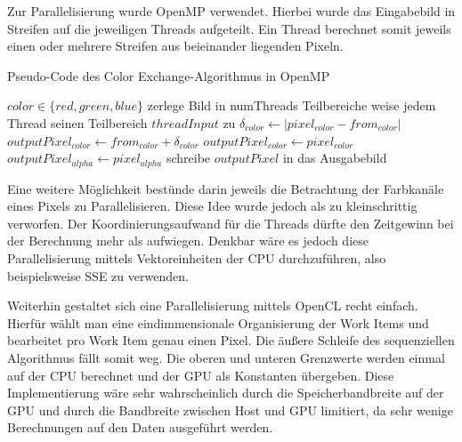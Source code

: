 \documentclass[10pt,a4paper]{article}
\providecommand{\abs}[1]{\lvert#1\rvert}
\begin{document}
Zur Parallelisierung wurde OpenMP verwendet. Hierbei wurde das Eingabebild in Streifen auf die jeweiligen Threads aufgeteilt. Ein Thread berechnet somit jeweils einen oder mehrere Streifen aus beieinander liegenden Pixeln.

\begin{algorithm}[H]
\caption{Pseudo-Code des \glqq Color Exchange\grqq-Algorithmus in OpenMP}
\label{algo:exchange_par}
\begin{algorithmic}[1]
\State $color \in \{red, green, blue\}$
\State zerlege Bild in numThreads Teilbereiche
\State weise jedem Thread seinen Teilbereich $threadInput$ zu
  \State $\delta_{color} \gets \abs{ pixel_{color} - from_{color}}$    
      \State $outputPixel_{color} \gets from_{color} + \delta_{color}$
    \EndFor
  \Else
      \State $outputPixel_{color} \gets pixel_{color}$
    \EndFor
  \EndIf
  \State $outputPixel_{alpha} \gets pixel_{alpha}$
  \State schreibe $outputPixel$ in das Ausgabebild
\EndFor
\EndFor
\end{algorithmic}
\end{algorithm}
 
Eine weitere Möglichkeit bestünde darin jeweils die Betrachtung der Farbkanäle eines Pixels zu Parallelisieren. Diese Idee wurde jedoch als zu kleinschrittig verworfen. Der Koordinierungsaufwand für die Threads dürfte den Zeitgewinn bei der Berechnung mehr als aufwiegen. Denkbar wäre es jedoch diese Parallelisierung mittels Vektoreinheiten der CPU durchzuführen, also beispielsweise SSE zu verwenden.

Weiterhin gestaltet sich eine Parallelisierung mittels OpenCL recht einfach. Hierfür wählt man eine eindimmensionale Organisierung der Work Items und bearbeitet pro Work Item genau einen Pixel. Die äußere Schleife des sequenziellen Algorithmus fällt somit weg. Die oberen und unteren Grenzwerte werden einmal auf der CPU berechnet und der GPU als Konstanten übergeben. Diese Implementierung wäre sehr wahrscheinlich durch die Speicherbandbreite auf der GPU und durch die Bandbreite zwischen Host und GPU limitiert, da sehr wenige Berechnungen auf den Daten ausgeführt werden.








\end{document}
